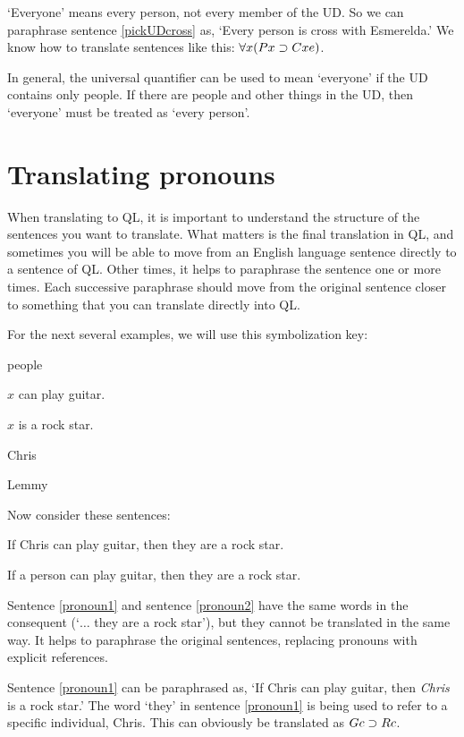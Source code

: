 `Everyone' means every person, not every member of the UD. So we can paraphrase sentence \ref{pickUDcross} as, `Every person is cross with Esmerelda.' We know how to translate sentences like this: $\forall x(Px \supset Cxe)$.

In general, the universal quantifier can be used to mean `everyone' if the UD contains only people. If there are people and other things in the UD, then `everyone' must be treated as `every person'.





\section{Translating pronouns}
When translating to QL, it is important to understand the structure of the sentences you want to translate. What matters is the final translation in QL, and sometimes you will be able to move from an English language sentence directly to a sentence of QL. Other times, it helps to paraphrase the sentence one or more times. Each successive paraphrase should move from the original sentence closer to something that you can translate directly into QL.

For the next several examples, we will use this symbolization key:

\begin{ekey}
\item[UD:] people
\item[Gx:] $x$ can play guitar.
\item[Rx:] $x$ is a rock star.
\item[c:] Chris
\item[l:] Lemmy
\end{ekey}

Now consider these sentences:

\begin{earg}
\item[\ex{pronoun1}] If Chris can play guitar, then they are a rock star.
\item[\ex{pronoun2}] If a person can play guitar, then they are a rock star.
\end{earg}

Sentence \ref{pronoun1} and sentence \ref{pronoun2} have the same words in the consequent (`$\ldots$ they are a rock star'), but they cannot be translated in the same way. It helps to paraphrase the original sentences, replacing pronouns with explicit references.

Sentence \ref{pronoun1} can be paraphrased as, `If Chris can play guitar, then \emph{Chris} is a rock star.' The word `they' in sentence \ref{pronoun1} is being used to refer to a specific individual, Chris. This can obviously be translated as $Gc \supset Rc$.

